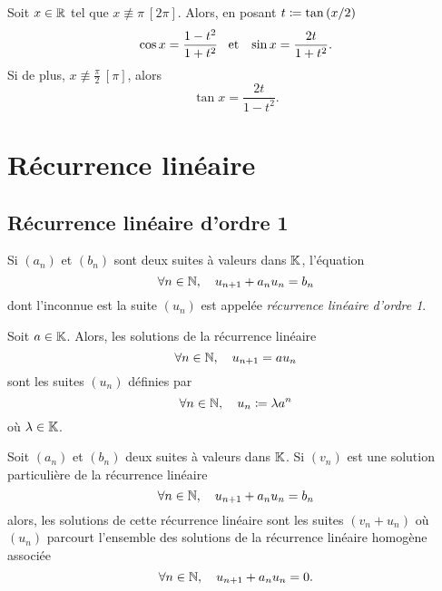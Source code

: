 \documentclass{magnoliaold}
\begin{document}
\begin{proposition}[utile=-3]
Soit $x\in\mathbb{R}$ tel que $x\not\equiv \pi\ [2\pi]$. Alors, en posant $t\coloneqq\tan\left(x/2\right)$
\[\cos x=\frac{1-t^2}{1+t^2} \quad\!\text{et}\quad\! \sin x=\frac{2t}{1+t^2}.\]
Si de plus, $x\not\equiv\frac{\pi}{2}\ [\pi]$, alors
\[\tan x=\frac{2t}{1-t^2}.\]
\end{proposition}



\section{Récurrence linéaire}

 \subsection{Récurrence linéaire d'ordre 1}


\begin{definition}
Si $(a_n)$ et $(b_n)$ sont deux suites à valeurs dans $\mathbb{K}$, l'équation
\[\forall n\in\mathbb{N},\quad u_{n+1} + a_n u_n = b_n\]
dont l'inconnue est la suite $(u_n)$ est appelée \emph{récurrence linéaire d'ordre 1}.
\end{definition}

\begin{proposition}
Soit $a\in\mathbb{K}$. Alors, les solutions de la récurrence linéaire
\[\forall n\in\mathbb{N},\quad u_{n+1}=a u_n\]
sont les suites $(u_n)$ définies par
\[\forall n\in\mathbb{N},\quad u_n\coloneqq \lambda a^n\]
où $\lambda\in\mathbb{K}$.
\end{proposition}

\begin{proposition}
Soit $(a_n)$ et $(b_n)$ deux suites à valeurs dans $\mathbb{K}$. Si $(v_n)$ est une solution
\og particulière \fg de la récurrence linéaire
\[\forall n\in\mathbb{N},\quad u_{n+1}+a_n u_n = b_n\]
alors, les solutions de cette récurrence linéaire sont les suites $(v_n+u_n)$ où
$(u_n)$ parcourt l'ensemble des solutions de la récurrence linéaire homogène associée
\[\forall n\in\mathbb{N},\quad u_{n+1}+a_n u_n=0.\]
\end{proposition}
\end{document}
